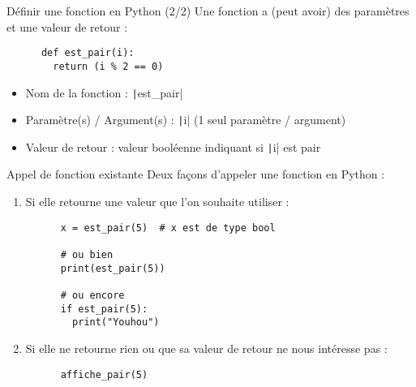 \documentclass[10pt]{beamer}
\begin{document}
\begin{frame}[fragile]{Définir une fonction en Python (2/2)}  
  Une fonction a (peut avoir) des paramètres et une valeur de retour :
    
    \begin{beamercodeblock}
      \begin{verbatim}
      def est_pair(i):
        return (i % 2 == 0)
      \end{verbatim}
    \end{beamercodeblock}

  \begin{itemize}
    \item Nom de la fonction : \texttt|est_pair|
    \item Paramètre(s) / Argument(s) : \texttt|i| (1 seul paramètre / argument)
    \item Valeur de retour : valeur booléenne indiquant si \texttt|i| est pair
  \end{itemize}
\end{frame} 

\begin{frame}[fragile]{Appel de fonction existante}  
  Deux façons d'appeler une fonction en Python :
  \begin{enumerate}
    \item Si elle retourne une valeur que l'on souhaite utiliser :
    
    \begin{beamercodeblock}
      \begin{verbatim}
      x = est_pair(5)  # x est de type bool

      # ou bien
      print(est_pair(5))

      # ou encore
      if est_pair(5):
        print("Youhou")
      \end{verbatim}
    \end{beamercodeblock}

    \item Si elle ne retourne rien ou que sa valeur de \alert{retour} ne nous intéresse pas :
    
    \begin{beamercodeblock}
      \begin{verbatim}
      affiche_pair(5)
      \end{verbatim}
    \end{beamercodeblock}
  \end{enumerate}
\end{frame}
\end{document}
